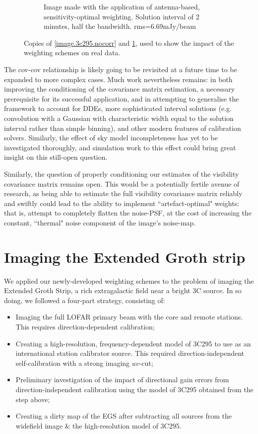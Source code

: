\begin{figure}[h!]
\begin{subfigure}{.49\textwidth}
\caption{\label{image.3c295.antcorr1} Image made with the application of antenna-based, sensitivity-optimal weighting. Solution interval of 2 minutes, half the bandwidth. rms=6.69mJy/beam}
\end{subfigure}
\caption{\label{stuff} Copies of \cref{image.3c295.nocorr} and \cref{image.3c295.antcorr1}, used to show the impact of the weighting schemes on real data.}
\end{figure}

\pg
The cov-cov relationship is likely going to be revisited at a future time to be expanded to more complex cases. Much work nevertheless remains: in both improving the conditioning of the covariance matrix estimation, a necessary prerequisite for its successful application, and in attempting to generalise the framework to account for DDEs, more sophisticated interval solutions (e.g. convolution with a Gaussian with characteristic width equal to the solution interval rather than simple binning), and other modern features of calibration solvers. Similarly, the effect of sky model incompleteness has yet to be investigated thoroughly, and simulation work to this effect could bring great insight on this still-open question.

\pg
Similarly, the question of properly conditioning our estimates of the visibility covariance matrix remains open. This would be a potentially fertile avenue of research, as being able to estimate the full visibility covariance matrix reliably and swiftly could lead to the ability to implement ``artefact-optimal" weights: that is, attempt to completely flatten the noise-PSF, at the cost of increasing the constant, ``thermal" noise component of the image's noise-map.



\section{Imaging the Extended Groth strip}

\pg
We applied our newly-developed weighting schemes to the problem of imaging the Extended Groth Strip, a rich extragalactic field near a bright 3C source. In so doing, we followed a four-part strategy, consisting of:
\begin{itemize}
\item Imaging the full LOFAR primary beam with the core and remote stations. This requires direction-dependent calibration;
\item Creating a high-resolution, frequency-dependent model of 3C295 to use as an international station calibrator source. This required direction-independent self-calibration with a strong imaging $uv$-cut;
\item Preliminary investigation of the impact of directional gain errors from direction-independent calibration using the model of 3C295 obtained from the step above;
\item Creating a dirty map of the EGS after subtracting all sources from the widefield image \& the high-resolution model of 3C295.
\end{itemize}


